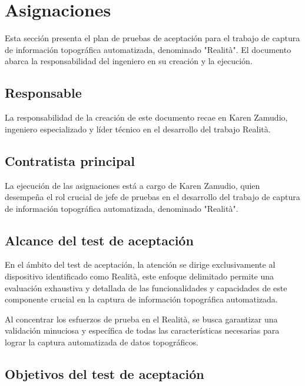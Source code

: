 \documentclass[12pt,a4paper, twoside]{article} %
\begin{document}
\section{Asignaciones}
\label{sec:orgc1c4017}


Esta sección presenta el plan de pruebas de aceptación para el trabajo de captura de información topográfica automatizada, denominado "Realità". El documento abarca la responsabilidad del ingeniero en su creación y la ejecución.


\subsection{Responsable}
\label{sec:orgdaca22c}

La responsabilidad de la creación de este documento recae en Karen Zamudio, ingeniero especializado y líder técnico en el desarrollo del trabajo Realità.


\subsection{Contratista principal}
\label{sec:descripcion-general}

La ejecución de las asignaciones está a cargo de Karen Zamudio, quien desempeña el rol crucial de jefe de pruebas en el desarrollo del trabajo de captura de información topográfica automatizada, denominado "Realità".

\subsection{Alcance del test de aceptación}
\label{sec:requisitos-especificos}


En el ámbito del test de aceptación, la atención se dirige exclusivamente al dispositivo identificado como Realità, este enfoque delimitado permite una evaluación exhaustiva y detallada de las funcionalidades y capacidades de este componente crucial en la captura de información topográfica automatizada. 

Al concentrar los esfuerzos de prueba en el Realità, se busca garantizar una validación minuciosa y específica de todas las características necesarias para lograr la captura automatizada de datos topográficos.

\subsection{Objetivos del test de aceptación}
\label{sec:requisitos-especificos}
\end{document}
